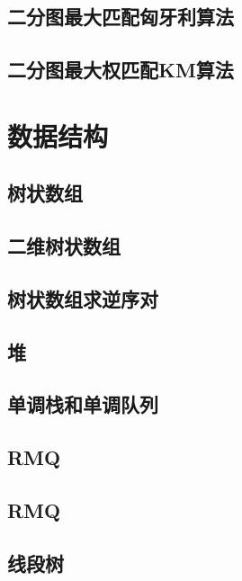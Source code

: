 \section{二分图最大匹配匈牙利算法}
\raggedbottom
\hrulefill
\section{二分图最大权匹配KM算法}
\raggedbottom
\hrulefill

\chapter{数据结构}
\section{树状数组}
\raggedbottom
\hrulefill
\section{二维树状数组}
\raggedbottom
\hrulefill
\section{树状数组求逆序对}
\raggedbottom
\hrulefill
\section{堆}
\raggedbottom
\hrulefill
\section{单调栈和单调队列}
\raggedbottom
\hrulefill
\section{RMQ}
\raggedbottom
\hrulefill
\section{RMQ}
\raggedbottom
\hrulefill
\section{线段树}
\raggedbottom
\hrulefill
